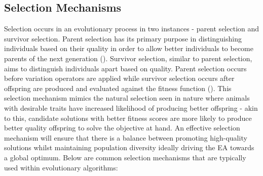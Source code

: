 \subsection{Selection Mechanisms}\label{sec:selection_mechanisms}
Selection occurs in an evolutionary process in two instances - parent selection and survivor selection. Parent selection has its primary purpose in distinguishing individuals based on their quality in order to allow better individuals to become parents of the next generation (\cite{handsOnGeneticAlgorithms}). Survivor selection, similar to parent selection, aims to distinguish individuals apart based on quality. Parent selection occurs before variation operators are applied while survivor selection occurs after offspring are produced and evaluated against the fitness function (\cite{book_introduction_to_evolutionary_computing}). This selection mechanism mimics the natural selection seen in nature where animals with desirable traits have increased likelihood of producing better offspring - akin to this, candidate solutions with better fitness scores are more likely to produce better quality offspring to solve the objective at hand. An effective selection mechanism will ensure that there is a balance between promoting high-quality solutions whilst maintaining population diversity ideally driving the EA towards a global optimum. Below are common selection mechanisms that are typically used within evolutionary algorithms:

